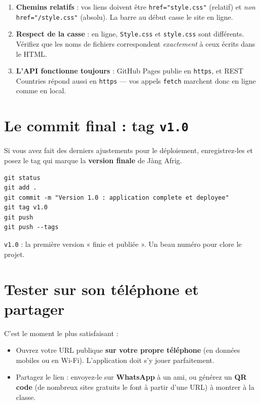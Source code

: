 \documentclass[11pt,a4paper]{article}
\newcommand{\code}[1]{\texttt{#1}}
\begin{document}
\begin{attentionbox}
\begin{enumerate}[leftmargin=*,noitemsep]
  \item \textbf{Chemins relatifs} : vos liens doivent être \code{href="style.css"} (relatif) et \emph{non} \code{href="/style.css"} (absolu). La barre au début casse le site en ligne.
  \item \textbf{Respect de la casse} : en ligne, \code{Style.css} et \code{style.css} sont différents. Vérifiez que les noms de fichiers correspondent \emph{exactement} à ceux écrits dans le HTML.
  \item \textbf{L'API fonctionne toujours} : GitHub Pages publie en \code{https}, et REST Countries répond aussi en \code{https} --- vos appels \code{fetch} marchent donc en ligne comme en local.
\end{enumerate}
\end{attentionbox}

\section{Le commit final : tag \texttt{v1.0}}

Si vous avez fait des derniers ajustements pour le déploiement, enregistrez-les et posez le tag qui marque la \textbf{version finale} de Jàng Afrig.

\begin{retenirbox}
\begin{lstlisting}[style=html]
git status
git add .
git commit -m "Version 1.0 : application complete et deployee"
git tag v1.0
git push
git push --tags
\end{lstlisting}
\code{v1.0} : la première version « finie et publiée ». Un beau numéro pour clore le projet.
\end{retenirbox}

\section{Tester sur son téléphone et partager}

C'est le moment le plus satisfaisant :
\begin{itemize}[leftmargin=*,noitemsep]
  \item Ouvrez votre URL publique \textbf{sur votre propre téléphone} (en données mobiles ou en Wi-Fi). L'application doit s'y jouer parfaitement.
  \item Partagez le lien : envoyez-le sur \textbf{WhatsApp} à un ami, ou générez un \textbf{QR code} (de nombreux sites gratuits le font à partir d'une URL) à montrer à la classe.
\end{itemize}
\end{document}
